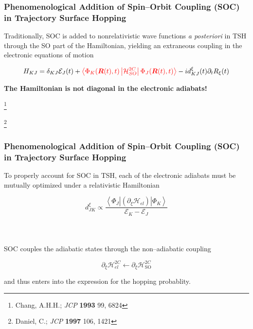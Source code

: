 \documentclass[usepdftitle=false,10pt]{beamer}
\newcommand{\innerop}[3]{\left\langle #1 \left\vert #2 \right\vert #3 \right\rangle}  %
\newcommand*\vc[1]{\boldsymbol{#1}}
\newcommand\blfootnote[1]{%
  \begingroup
  \renewcommand\thefootnote{}\footnote{#1}%
  \addtocounter{footnote}{-1}%
  \endgroup
}
\begin{document}
\begin{frame}
  \frametitle{Phenomenological Addition of Spin--Orbit Coupling (SOC) in
  Trajectory Surface Hopping}

  Traditionally, SOC is added to nonrelativistic wave functions 
  \emph{a posteriori} in TSH through the SO part of the 
  Hamiltonian, yielding an extraneous coupling in the electronic equations of motion

%

  \begin{equation*}
    H_{KJ} = \delta_{KJ}\mathcal{E}_J(t) +
    {\color{red}
      \innerop{\Phi_K(\vc{R}(t),t)}{\mathcal{H}_{SO}^{2C}}{\Phi_J(\vc{R}(t),t)}
    }
    - i d_{KJ}^\xi (t) \partial_t R_{\xi}(t) 
  \end{equation*}

  \vfill
  \begin{center}
  {\LARGE \bf The Hamiltonian is not diagonal in the electronic adiabats!}
  \end{center}
  \blfootnote{\tiny Chang, A.H.H.; \emph{JCP} \textbf{1993} 99, 6824}
  \blfootnote{\tiny Daniel, C.; \emph{JCP} \textbf{1997} 106, 1421}
\end{frame}

\begin{frame}
  \frametitle{Phenomenological Addition of Spin--Orbit Coupling (SOC) in
  Trajectory Surface Hopping}

  To properly account for SOC in TSH, each of the electronic adiabats must
  be mutually optimized under a relativistic Hamiltonian

  \begin{equation*}
    d_{JK}^\xi \propto \frac{\innerop{\Phi_J}{(\partial_\xi \mathcal{H}_{el})}{\Phi_K}}{\mathcal{E}_K - \mathcal{E}_J}
  \end{equation*}
  ~\\
  ~\\
  ~\\

  SOC couples the adiabatic states through the non--adiabatic coupling

  \begin{equation*}
    \partial_\xi \mathcal{H}^{2C}_{el} \leftarrow \partial_\xi \mathcal{H}^{2C}_\mathrm{SO}
  \end{equation*}

  and thus enters into the expression for the hopping probablity.
\end{frame}
\end{document}
